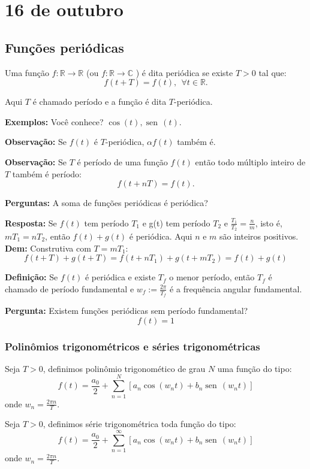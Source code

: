 \documentclass[a4paper,10pt]{book}
\newcommand{\sen}{\operatorname{sen}\,}
\renewcommand{\sin}{\operatorname{sen}\,}
\begin{document}
\chapter{16 de outubro}
\section{Funções periódicas}

Uma função $f:\mathbb{R}\to \mathbb{R}$ (ou $f:\mathbb{R}\to \mathbb{C}$ ) é dita periódica se existe $T>0$ tal que:
$$f(t+T)=f(t),~~ \forall t\in \mathbb{R}.$$

Aqui $T$ é chamado período e a função é dita $T$-periódica.

{\bf Exemplos:} Você conhece? $\cos(t), \sin(t)$.

% 
{\bf Observação:} Se $f(t)$ é $T$-periódica, $\alpha f(t)$ também é.

{\bf Observação:} Se $T$ é período de uma função $f(t)$ então todo múltiplo inteiro de $T$ também é período:
 $$f(t+nT)=f(t).$$
% 

{\bf Perguntas:} A soma de funções periódicas é periódica?

{\bf Resposta:} Se $f(t)$ tem período $T_1$ e g(t) tem período $T_2$ e $\frac{T_1}{T_2}=\frac{n}{m}$, isto é, $mT_1 = nT_2$, então $f(t)+g(t)$ é periódica. Aqui $n$ e $m$ são inteiros positivos.
{\bf Dem:} Construtiva com $T=mT_1$:
$$f(t+T)+g(t+T)=f(t+nT_1)+g(t+mT_2)=f(t)+g(t)$$
% 

 {\bf Definição:} Se $f(t)$ é periódica e existe $T_f$ o menor período, então $T_f$ é chamado de período fundamental e $w_f:=\frac{2\pi}{T_f}$ é a frequência angular fundamental.

{\bf Pergunta:} Existem funções periódicas sem período fundamental?
$$f(t)=1$$
% 
\subsection{Polinômios trigonométricos e séries trigonométricas}
 Seja $T>0$, definimos polinômio trigonomético de grau $N$ uma função do tipo:
 \begin{equation}f(t)=\frac{a_0}{2}+ \sum_{n=1}^N \left[a_n \cos(w_n t) + b_n \sen(w_nt)\right] \end{equation}
 onde $w_n=\frac{2\pi n}{T}$.
% 

  Seja $T>0$, definimos série trigonométrica toda função do tipo:
\begin{equation}f(t)=\frac{a_0}{2}+ \sum_{n=1}^\infty \left[a_n \cos(w_n t) + b_n \sen(w_n t)\right] \end{equation}
 onde $w_n=\frac{2\pi n}{T}$.
\end{document}

